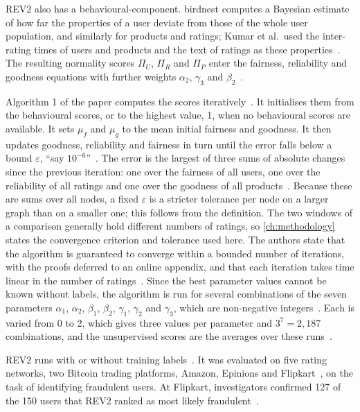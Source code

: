 REV2 also has a \gls{behavioural-component}. \Gls{birdnest} computes a Bayesian estimate of how far the properties of a user deviate from those of the whole user population, and similarly for products and ratings; Kumar et al.\ used the inter-rating times of users and products and the text of ratings as these properties~\cite[p.~337]{Kumar2018}. The resulting normality scores $\Pi_U$, $\Pi_R$ and $\Pi_P$ enter the fairness, reliability and goodness equations with further weights $\alpha_2$, $\gamma_3$ and $\beta_2$~\cite[p.~337]{Kumar2018}.

Algorithm 1 of the paper computes the scores iteratively~\cite[p.~337]{Kumar2018}. It initialises them from the behavioural scores, or to the highest value, 1, when no behavioural scores are available. It sets $\mu_f$ and $\mu_g$ to the mean initial fairness and goodness. It then updates goodness, reliability and fairness in turn until the error falls below a bound $\varepsilon$, \enquote{say $10^{-6}$}~\cite[p.~337]{Kumar2018}. The error is the largest of three sums of absolute changes since the previous iteration: one over the fairness of all users, one over the reliability of all ratings and one over the goodness of all products~\cite[p.~337]{Kumar2018}. Because these are sums over all nodes, a fixed $\varepsilon$ is a stricter tolerance per node on a larger graph than on a smaller one; this follows from the definition. The two windows of a comparison generally hold different numbers of ratings, so \cref{ch:methodology} states the convergence criterion and tolerance used here. The authors state that the algorithm is guaranteed to converge within a bounded number of iterations, with the proofs deferred to an online appendix, and that each iteration takes time linear in the number of ratings~\cite[p.~338]{Kumar2018}. Since the best parameter values cannot be known without labels, the algorithm is run for several combinations of the seven parameters $\alpha_1$, $\alpha_2$, $\beta_1$, $\beta_2$, $\gamma_1$, $\gamma_2$ and $\gamma_3$, which are non-negative integers~\cite[p.~337]{Kumar2018}. Each is varied from 0 to 2, which gives three values per parameter and $3^7 = 2{,}187$ combinations, and the unsupervised scores are the averages over these runs~\cite[p.~337]{Kumar2018}.

REV2 runs with or without training labels~\cite[p.~334]{Kumar2018}. It was evaluated on five rating networks, two Bitcoin trading platforms, Amazon, Epinions and Flipkart~\cite[p.~338]{Kumar2018}, on the task of identifying fraudulent users. At Flipkart, investigators confirmed 127 of the 150 users that REV2 ranked as most likely fraudulent~\cite[p.~333]{Kumar2018}.

